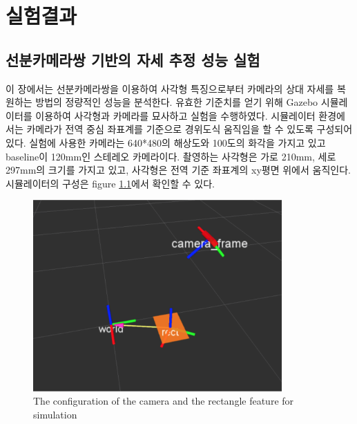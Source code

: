 \documentclass[master,korean,final]{cbnu-ecs}
\begin{document}
\chapter{실험결과}
\section{선분카메라쌍 기반의 자세 추정 성능 실험}
이 장에서는 선분카메라쌍을 이용하여 사각형 특징으로부터 카메라의 상대 자세를 복원하는 방법의 정량적인 성능을 분석한다. 유효한 기준치를 얻기 위해 Gazebo 시뮬레이터를 이용하여 사각형과 카메라를 묘사하고 실험을 수행하였다. 시뮬레이터 환경에서는 카메라가 전역 중심 좌표계를 기준으로 경위도식 움직임을 할 수 있도록 구성되어 있다. 실험에 사용한 카메라는 640*480의 해상도와 100도의 화각을 가지고 있고 baseline이 120mm인 스테레오 카메라이다. 촬영하는 사각형은 가로 210mm, 세로 297mm의 크기를 가지고 있고, 사각형은 전역 기준 좌표계의 xy평면 위에서 움직인다. 시뮬레이터의 구성은 figure \ref{gazebo}에서 확인할 수 있다.
\begin{figure}[!ht]
  \centering
	\includegraphics[width=360px]{img/gazebo.png}
  \caption{The configuration of the camera and the rectangle feature for simulation }
\label{gazebo}
\end{figure}
\end{document}
